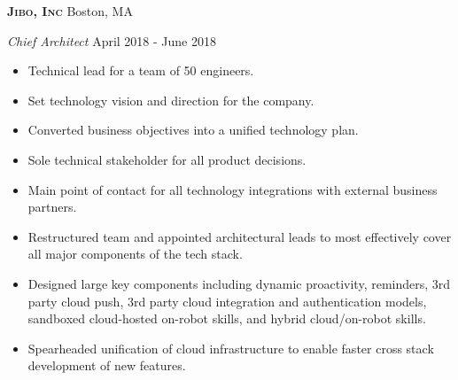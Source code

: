 \documentclass[a4paper]{article}
\begin{document}
\newpage

\textbf{\textsc{Jibo, Inc}} \hfill Boston, MA\\
\vspace{2mm}

\begin{addmargin}[1em]{0em}
    \textit{Chief Architect} \hfill April 2018 - June 2018\\
    \vspace{-1mm}
    \begin{itemize} \itemsep 1pt
        \item Technical lead for a team of 50 engineers.
        \item Set technology vision and direction for the company.
        \item Converted business objectives into a unified technology plan.
        \item Sole technical stakeholder for all product decisions.
        \item Main point of contact for all technology integrations with external
            business partners.
        \item Restructured team and appointed architectural leads to most effectively
            cover all major components of the tech stack.
        \item Designed large key components including dynamic proactivity, reminders, 3rd party
            cloud push, 3rd party cloud integration and authentication models, 
            sandboxed cloud-hosted on-robot skills, and hybrid cloud/on-robot skills.
        \item Spearheaded unification of cloud infrastructure to enable faster cross stack
            development of new features.
        

\end{itemize}
\end{addmargin}
\end{document}
